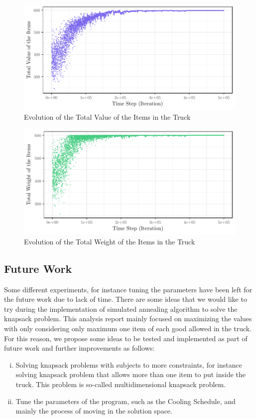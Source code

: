 \begin{figure}[H]
    \centering
    \includegraphics[width=\textwidth]{images/value}
    \caption{Evolution of the Total Value of the Items in the Truck}
    \label{fig:values}
\end{figure}

\begin{figure}[H]
    \centering
    \includegraphics[width=\textwidth]{images/weight}
    \caption{Evolution of the Total Weight of the Items in the Truck}
    \label{fig:weights}
\end{figure}



\subsection*{Future Work}

Some different experiments, for instance tuning the parameters have been left for the future work due to lack of time. There are some ideas that we would like to try during the implementation of simulated annealing algorithm to solve the knapsack problem. This analysis report mainly focused on maximizing the values with only considering only maximum one item of each good allowed in the truck. For this reason, we propose some ideas to be tested and implemented as part of future work and further improvements as follows:
\begin{enumerate}[(i)]
	\item Solving knapsack problems with subjects to more constraints, for instance solving knapsack problem that allows more than one item to put inside the truck. This problem is so-called multidimensional knapsack problem. \cite{Qian2007}
    \item Tune the parameters of the program, such as the Cooling Schedule, and mainly the process of moving in the solution space.
\end{enumerate}